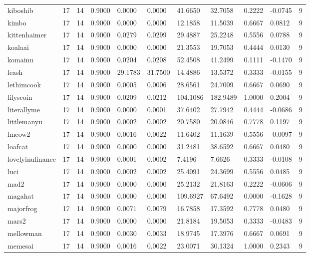 \begin{table}[htbp]
\begin{tabular}{lllllllllll}
kiboshib & 17 & 14 & 0.9000 & 0.0000 & 0.0000 & 41.6650 & 32.7058 & 0.2222 & -0.0745 & 9 \\
kimbo & 17 & 14 & 0.9000 & 0.0000 & 0.0000 & 12.1858 & 11.5039 & 0.6667 & 0.0812 & 9 \\
kittenhaimer & 17 & 14 & 0.9000 & 0.0279 & 0.0299 & 29.4887 & 25.2248 & 0.5556 & 0.0788 & 9 \\
koalaai & 17 & 14 & 0.9000 & 0.0000 & 0.0000 & 21.3553 & 19.7053 & 0.4444 & 0.0130 & 9 \\
komainu & 17 & 14 & 0.9000 & 0.0204 & 0.0208 & 52.4508 & 41.2499 & 0.1111 & -0.1470 & 9 \\
leash & 17 & 14 & 0.9000 & 29.1783 & 31.7500 & 14.4886 & 13.5372 & 0.3333 & -0.0155 & 9 \\
lethimcook & 17 & 14 & 0.9000 & 0.0005 & 0.0006 & 28.6561 & 24.7009 & 0.6667 & 0.0690 & 9 \\
lilyscoin & 17 & 14 & 0.9000 & 0.0209 & 0.0212 & 104.1086 & 182.9489 & 1.0000 & 0.2004 & 9 \\
literallyme & 17 & 14 & 0.9000 & 0.0000 & 0.0001 & 37.6402 & 27.7942 & 0.4444 & -0.0686 & 9 \\
littlemanyu & 17 & 14 & 0.9000 & 0.0002 & 0.0002 & 20.7580 & 20.0846 & 0.7778 & 0.1197 & 9 \\
lmeow2 & 17 & 14 & 0.9000 & 0.0016 & 0.0022 & 11.6402 & 11.1639 & 0.5556 & -0.0097 & 9 \\
loafcat & 17 & 14 & 0.9000 & 0.0000 & 0.0000 & 31.2481 & 38.6592 & 0.6667 & 0.0480 & 9 \\
lovelyinufinance & 17 & 14 & 0.9000 & 0.0001 & 0.0002 & 7.4196 & 7.6626 & 0.3333 & -0.0108 & 9 \\
luci & 17 & 14 & 0.9000 & 0.0002 & 0.0002 & 25.4091 & 24.3699 & 0.5556 & 0.0485 & 9 \\
mad2 & 17 & 14 & 0.9000 & 0.0000 & 0.0000 & 25.2132 & 21.8163 & 0.2222 & -0.0606 & 9 \\
magahat & 17 & 14 & 0.9000 & 0.0000 & 0.0000 & 109.6927 & 67.6492 & 0.0000 & -0.1628 & 9 \\
majorfrog & 17 & 14 & 0.9000 & 0.0071 & 0.0079 & 16.7858 & 17.3592 & 0.7778 & 0.0480 & 9 \\
mars2 & 17 & 14 & 0.9000 & 0.0000 & 0.0000 & 21.8184 & 19.5053 & 0.3333 & -0.0483 & 9 \\
mellowman & 17 & 14 & 0.9000 & 0.0030 & 0.0033 & 18.9745 & 17.3976 & 0.6667 & 0.0691 & 9 \\
memesai & 17 & 14 & 0.9000 & 0.0016 & 0.0022 & 23.0071 & 30.1324 & 1.0000 & 0.2343 & 9 \\

\end{tabular}
\end{table}

